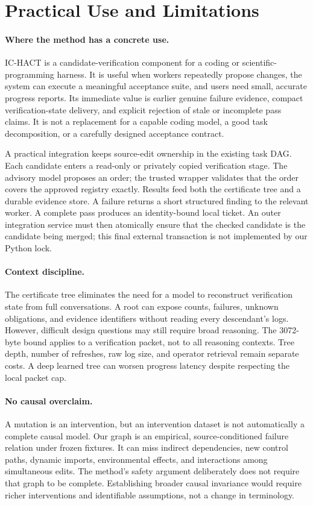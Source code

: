 \section{Practical Use and Limitations}
\paragraph{Where the method has a concrete use.}
IC-HACT is a candidate-verification component for a coding or scientific-programming harness. It is useful when workers repeatedly propose changes, the system can execute a meaningful acceptance suite, and users need small, accurate progress reports. Its immediate value is earlier genuine failure evidence, compact verification-state delivery, and explicit rejection of stale or incomplete pass claims. It is not a replacement for a capable coding model, a good task decomposition, or a carefully designed acceptance contract.

A practical integration keeps source-edit ownership in the existing task DAG. Each candidate enters a read-only or privately copied verification stage. The advisory model proposes an order; the trusted wrapper validates that the order covers the approved registry exactly. Results feed both the certificate tree and a durable evidence store. A failure returns a short structured finding to the relevant worker. A complete pass produces an identity-bound local ticket. An outer integration service must then atomically ensure that the checked candidate is the candidate being merged; this final external transaction is not implemented by our Python lock.

\paragraph{Context discipline.}
The certificate tree eliminates the need for a model to reconstruct verification state from full conversations. A root can expose counts, failures, unknown obligations, and evidence identifiers without reading every descendant's logs. However, difficult design questions may still require broad reasoning. The 3072-byte bound applies to a verification packet, not to all reasoning contexts. Tree depth, number of refreshes, raw log size, and operator retrieval remain separate costs. A deep learned tree can worsen progress latency despite respecting the local packet cap.

\paragraph{No causal overclaim.}
A mutation is an intervention, but an intervention dataset is not automatically a complete causal model. Our graph is an empirical, source-conditioned failure relation under frozen fixtures. It can miss indirect dependencies, new control paths, dynamic imports, environmental effects, and interactions among simultaneous edits. The method's safety argument deliberately does not require that graph to be complete. Establishing broader causal invariance would require richer interventions and identifiable assumptions, not a change in terminology.

